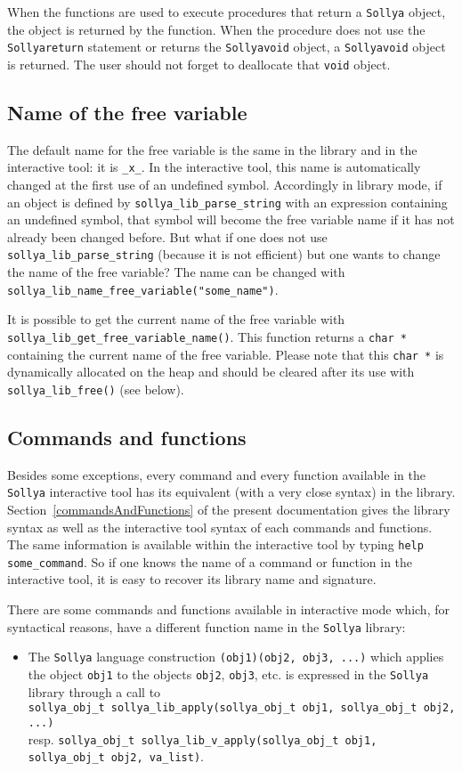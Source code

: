 \documentclass[a4paper]{article}
\newcommand{\sollya}{\texttt{Sollya}\xspace}
\begin{document}
When the functions are used to execute procedures that return a
\sollya object, the object is returned by the function. When the
procedure does not use the \sollya \verb|return| statement or returns
the \sollya \verb|void| object, a \sollya \verb|void| object is
returned. The user should not forget to deallocate that \verb|void|
object. 

\subsection{Name of the free variable}
The default name for the free variable is the same in the library and in the interactive tool: it is \texttt{\_x\_}. In the interactive tool, this name is automatically changed at the first use of an undefined symbol. Accordingly in library mode, if an object is defined by \texttt{sollya\_lib\_parse\_string} with an expression containing an undefined symbol, that symbol will become the free variable name if it has not already been changed before. But what if one does not use \texttt{sollya\_lib\_parse\_string} (because it is not efficient) but one wants to change the name of the free variable? The name can be changed with \texttt{sollya\_lib\_name\_free\_variable("some\_name")}.

It is possible to get the current name of the free variable with \texttt{sollya\_lib\_get\_free\_variable\_name()}. This function returns a \texttt{char *} containing the current name of the free variable. Please note that this \texttt{char *} is dynamically allocated on the heap and should be cleared after its use with \texttt{sollya\_lib\_free()} (see below).

\subsection{Commands and functions}
\label{library_commands_and_functions}
Besides some exceptions, every command and every function available in the \sollya interactive tool has its equivalent (with a very close syntax) in the library. Section~\ref{commandsAndFunctions} of the present documentation gives the library syntax as well as the interactive tool syntax of each commands and functions. The same information is available within the interactive tool by typing \texttt{help some\_command}. So if one knows the name of a command or function in the interactive tool, it is easy to recover its library name and signature.

There are some commands and functions available in interactive mode which, for syntactical reasons, have a different function name in the \sollya library:
\begin{itemize}
  \item The \sollya language construction \texttt{(obj1)(obj2, obj3, ...)} which applies the object \texttt{obj1} to the objects \texttt{obj2}, \texttt{obj3}, etc. is expressed in the \sollya library through a call to\\
 \texttt{sollya\_obj\_t sollya\_lib\_apply(sollya\_obj\_t obj1, sollya\_obj\_t obj2, ...)}\\
 resp. \texttt{sollya\_obj\_t sollya\_lib\_v\_apply(sollya\_obj\_t obj1, sollya\_obj\_t obj2, va\_list)}.
\end{itemize}
\end{document}
